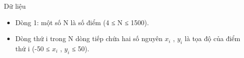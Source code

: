 Dữ liệu
\begin{itemize}
	\item     Dòng 1: một số N là số điểm (4 ≤ N ≤ 1500).   
	\item     Dòng thứ i trong N dòng tiếp chứa hai số nguyên   $x_{i}$    , $y_{i}$    là tọa độ của điểm thứ i (-50   ≤ $x_{i}$    , $y_{i}$    ≤ 50).   
\end{itemize}